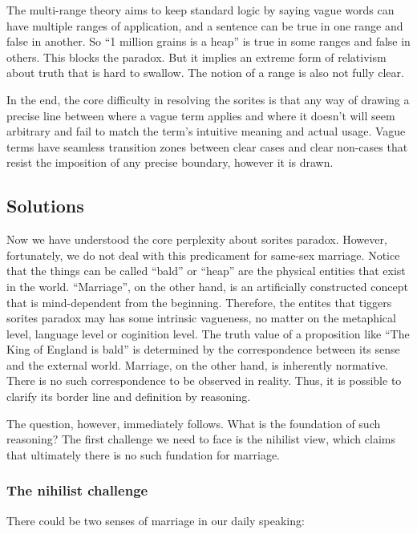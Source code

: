 \documentclass{article}
\begin{document}
The multi-range theory aims to keep standard logic by saying vague words can have multiple ranges of application, and a sentence can be true in one range and false in another. So ``1 million grains is a heap'' is true in some ranges and false in others. This blocks the paradox. But it implies an extreme form of relativism about truth that is hard to swallow. The notion of a range is also not fully clear.

In the end, the core difficulty in resolving the sorites is that any way of drawing a precise line between where a vague term applies and where it doesn't will seem arbitrary and fail to match the term's intuitive meaning and actual usage. Vague terms have seamless transition zones between clear cases and clear non-cases that resist the imposition of any precise boundary, however it is drawn.

\subsection{Solutions}

Now we have understood the core perplexity about sorites paradox. However, fortunately, we do not deal with this predicament for same-sex marriage. Notice that the things can be called ``bald'' or ``heap'' are the physical entities that exist in the world. ``Marriage'', on the other hand, is an artificially constructed concept that is mind-dependent from the beginning. Therefore, the entites that tiggers sorites paradox may has some intrinsic vagueness, no matter on the metaphical level, language level or coginition level. The truth value of a proposition like ``The King of England is bald'' is determined by the correspondence between its sense and the external world. Marriage, on the other hand, is inherently normative. There is no such correspondence to be observed in reality. Thus, it is possible to clarify its border line and definition by reasoning.

The question, however, immediately follows. What is the foundation of such reasoning? The first challenge we need to face is the nihilist view, which claims that ultimately there is no such fundation for marriage.

\subsubsection{The nihilist challenge}
\label{nihi}

There could be two senses of marriage in our daily speaking: 
\end{document}
